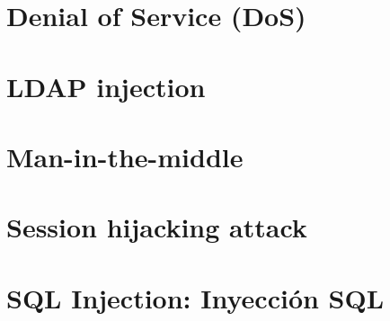 \documentclass[10pt, a4paper,spanish]{article}
\begin{document}
    \section{Denial of Service (DoS)}
        \paragraph{}


    \section{LDAP injection}
        \paragraph{}


    \section{Man-in-the-middle}
        \paragraph{}


    \section{Session hijacking attack}
        \paragraph{}


    \section{SQL Injection: Inyección SQL}
        \paragraph{}
\end{document}
